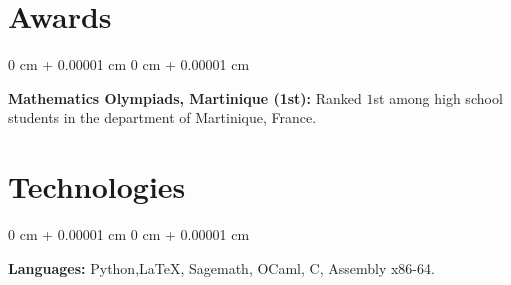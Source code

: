 \documentclass[10pt, letterpaper]{article}
\newenvironment{onecolentry}{
    \begin{adjustwidth}{
        0 cm + 0.00001 cm
    }{
        0 cm + 0.00001 cm
    }
}{
    \end{adjustwidth}
} %
\begin{document}
        \vspace{0.2 cm}



    
    \section{Awards}



        
        \begin{onecolentry}
            \textbf{Mathematics Olympiads, Martinique (1st):} Ranked $1$st among high school students in the department of Martinique, France.
        \end{onecolentry}


    
    \section{Technologies}



        
        \begin{onecolentry}
            \textbf{Languages:} Python,\LaTeX, Sagemath, OCaml, C, Assembly x86-64.
        \end{onecolentry}
    
\end{document}
